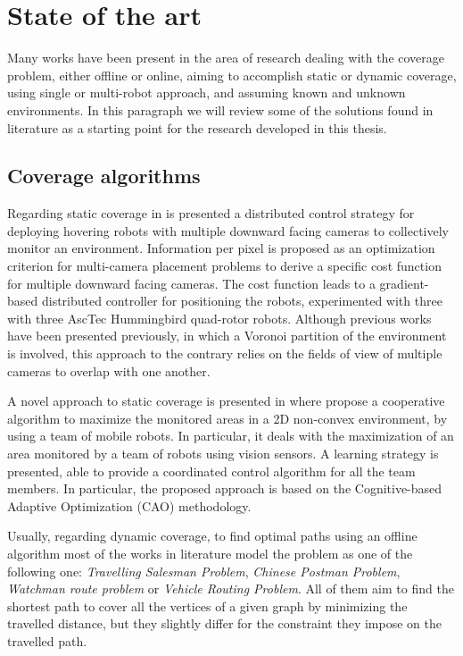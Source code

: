 \section{State of the art}

Many works have been present in the area of research dealing with the coverage problem, either offline or online, aiming to accomplish static or dynamic coverage, using single or multi-robot approach, and assuming known and unknown environments. In this paragraph we will review some of the solutions found in literature as a starting point for the research developed in this thesis.


\subsection{Coverage algorithms}

Regarding static coverage in \cite{5152815} is presented a distributed control strategy for deploying hovering robots with multiple downward facing cameras to collectively monitor an environment. Information per pixel is proposed as an optimization criterion for multi-camera placement problems  to derive a specific cost function for multiple downward facing cameras. The cost function leads to a gradient-based distributed controller for positioning the robots, experimented with three with three AscTec Hummingbird quad-rotor robots. Although previous works have been presented previously, in which a Voronoi partition of the environment is involved, this approach to the contrary relies on the fields of view of multiple cameras to overlap with one another.

A novel approach to static coverage is presented in \cite{5649249} where propose a cooperative algorithm to maximize the monitored areas in a 2D non-convex environment, by using a team of mobile robots. In particular, it deals with the maximization of an area monitored by a team of robots using vision sensors. A learning strategy is presented, able to provide a coordinated control algorithm for all the team members. In particular, the proposed approach is based on the Cognitive-based Adaptive Optimization (CAO) methodology.

Usually, regarding dynamic coverage, to find optimal paths using an offline algorithm most of the works in literature model the problem as one of the following one: \emph{Travelling Salesman Problem}, \emph{Chinese Postman Problem}, \emph{Watchman route problem} or \emph{Vehicle Routing Problem}. All of them aim to find the shortest path to cover all the vertices of a given graph by minimizing the travelled distance, but they slightly differ for the constraint they impose on the travelled path.

